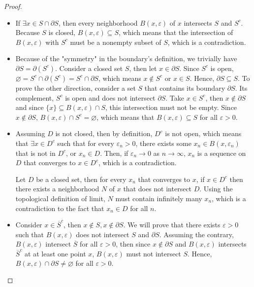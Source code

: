 \begin{proof}
\begin{itemize}
  \item If \( \exists  x \in S \cap \partial S \), then every neighborhood
    \( B(x, \varepsilon) \) of \( x \) intersects \( S \) and \( S^{c} \).
    Because \( S \) is closed, \( B(x, \varepsilon) \subseteq  S \), which means
    that the intersection of \( B(x, \varepsilon) \) with \( S^{c} \) must be a
    nonempty subset of \( S \), which is a contradiction.
  \item Because of the "symmetry" in the boundary's definition, we trivially
    have \( \partial S = \partial (S^{c}) \). Consider a closed set \( S \),
    then let \( x \in \partial S \).
    Since \( S^{c} \) is open, \( \varnothing = S^{c} \cap \partial (S^{c}) =
    S^{c} \cap \partial S \), which means \( x \notin S^{c} \) or \( x \in S \).
    Hence, \( \partial S \subseteq S \). To prove the other direction, consider a
    set \( S \) that contains its boundary \( \partial S \). Its complement, \(
    S^{c}\) is open and does not intersect \( \partial S \). Take \( x \in
    S^{c} \), then \( x \notin \partial S \) and since \( \{x\}  \subseteq B(x,
    \varepsilon) \cap S   \), this intersection must not be empty. Since \( x
    \notin \partial S \), \( B(x, \varepsilon) \cap S^{c} = \varnothing \),
    which means that \( B(x, \varepsilon) \subseteq S
    \) for all \( \varepsilon > 0 \).
  \item Assuming \( D \) is not closed, then by definition, \( D^{c} \) is not open,
    which means that \( \exists x \in D^{c} \) such that for every \(
    \varepsilon_{n} > 0\), there exists some \( x_{n} \in B(x, \varepsilon_{n}) \)
    that is not in \( D^{c} \), or \( x_{n} \in D \). Then, if \( \varepsilon_{n}
    \to  0\) as \( n \to  \infty \), \( x_{n} \) is a sequence on \( D \) that
    converges to \( x \in D^{c} \), which is a contradiction.

    Let \( D \) be a closed set, then for every \( x_{n} \) that converges to \( x
    \), if \( x \in D^{c} \) then there exists a neighborhood \( N \) of \( x \)
    that does not intersect \( D \). Using the topological definition of limit, \(
    N\) must contain infinitely many \( x_{n} \), which is a contradiction to the
    fact that \( x_{n} \in D \) for all \( n \).
    \item Consider \( x \in \overline{S}^{c} \), then \( x \notin S, x \notin
    \partial S \). We will prove that there exists \( \varepsilon > 0 \) such
    that \( B(x, \varepsilon) \) does not intersect \( S \) and \( \partial S
    \). Assuming the contrary, \( B(x, \varepsilon) \) intersect \( \overline{S}
    \) for all \( \varepsilon > 0 \), then since \( x \notin \partial S \) and
    \( B(x, \varepsilon) \) intersects \( \overline{S}^{c} \) at at least one
    point \( x \), \( B(x, \varepsilon) \) must not intersect \( S \). Hence,
    \( B(x, \varepsilon) \cap \partial S \neq  \varnothing \) for all \(
    \varepsilon > 0 \).


\end{itemize}
\end{proof}

